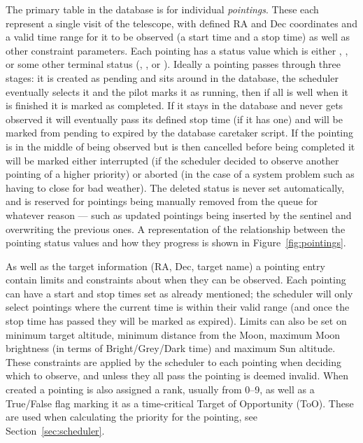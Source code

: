\begin{colsection}
\begin{colsection}
The primary table in the database is for individual \textit{pointings}. These each represent a single visit of the telescope, with defined RA and Dec coordinates and a valid time range for it to be observed (a start time and a stop time) as well as other constraint parameters. Each pointing has a status value which is either , ,  or some other terminal status (, ,  or ). Ideally a pointing passes through three stages: it is created as pending and sits around in the database, the scheduler eventually selects it and the pilot marks it as running, then if all is well when it is finished it is marked as completed. If it stays in the database and never gets observed it will eventually pass its defined stop time (if it has one) and will be marked from pending to expired by the database caretaker script. If the pointing is in the middle of being observed but is then cancelled before being completed it will be marked either interrupted (if the scheduler decided to observe another pointing of a higher priority) or aborted (in the case of a system problem such as having to close for bad weather). The deleted status is never set automatically, and is reserved for pointings being manually removed from the queue for whatever reason --- such as updated pointings being inserted by the sentinel and overwriting the previous ones. A representation of the relationship between the pointing status values and how they progress is shown in Figure~\ref{fig:pointings}.

As well as the target information (RA, Dec, target name) a pointing entry contain limits and constraints about when they can be observed. Each pointing can have a start and stop times set as already mentioned; the scheduler will only select pointings where the current time is within their valid range (and once the stop time has passed they will be marked as expired). Limits can also be set on minimum target altitude, minimum distance from the Moon, maximum Moon brightness (in terms of Bright/Grey/Dark time) and maximum Sun altitude. These constraints are applied by the scheduler to each pointing when deciding which to observe, and unless they all pass the pointing is deemed invalid. When created a pointing is also assigned a rank, usually from 0--9, as well as a True/False flag marking it as a time-critical Target of Opportunity (ToO). These are used when calculating the priority for the pointing, see Section~\ref{sec:scheduler}.


\end{colsection}
\end{colsection}
